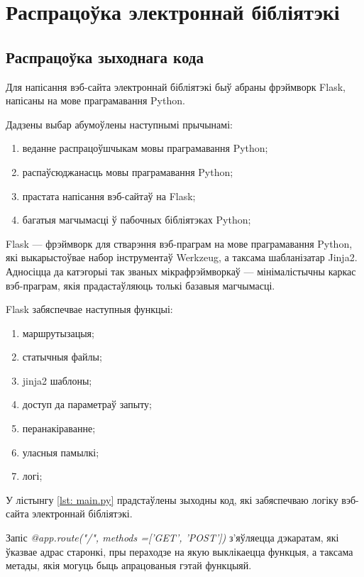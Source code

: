 \section{Распрацоўка электроннай бібліятэкі}

\subsection{Распрацоўка зыходнага кода}

Для напісання вэб-сайта электроннай бібліятэкі быў абраны фрэймворк Flask,
напісаны на мове праграмавання Python.

Дадзены выбар абумоўлены наступнымі прычынамі:
\begin{enumerate}
    \item веданне распрацоўшчыкам мовы праграмавання Python;
    \item распаўсюджанасць мовы праграмавання Python;
    \item прастата напісання вэб-сайтаў на Flask;
    \item багатыя магчымасці ў пабочных бібліятэках Python;
\end{enumerate}

Flask --- фрэймворк для стварэння вэб-праграм на мове праграмавання Python, які выкарыстоўвае набор інструментаў Werkzeug, а таксама шабланізатар Jinja2. Адносіцца да катэгорыі так званых мікрафрэймворкаў --- мінімалістычны каркас вэб-праграм, якія прадастаўляюць толькі базавыя магчымасці.

Flask забяспечвае наступныя функцыі:
\begin{enumerate}
    \item маршрутызацыя;
    \item статычныя файлы;
    \item jinja2 шаблоны;
    \item доступ да параметраў запыту;
    \item перанакіраванне;
    \item уласныя памылкі;
    \item логі;
\end{enumerate}

У лістынгу \ref{lst: main.py} прадстаўлены зыходны код, які забяспечваю логіку вэб-сайта электроннай
бібліятэкі.



Запіс \textit{@app.route("/", methods =['GET', 'POST'])} з'яўляецца дэкаратам, які ўказвае
адрас старонкі, пры пераходзе на якую выклікаецца функцыя, а таксама метады, якія могуць
быць апрацованыя гэтай функцыяй.

